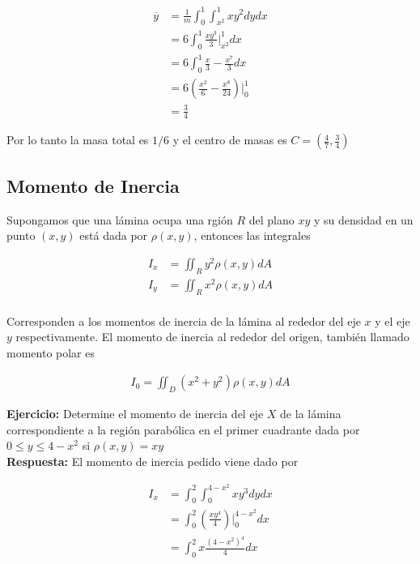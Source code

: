 \documentclass{article}
\theoremstyle{definition}
\begin{document}
\begin{align*}
    \overline{y} &= \frac{1}{m} \int_{0}^1\int_{x^2}^1 xy^2 dydx \\
        &= 6 \int_{0}^1 \frac{xy^3}{3}\bigg|_{x^2}^1 dx \\
        &= 6 \int_{0}^1 \frac{x}{3}-\frac{x^7}{3} dx \\
        &= 6 \left( \frac{x^2}{6}-\frac{x^8}{24} \right)\bigg|_0^1\\
        &=\frac{3}{4}
\end{align*}

Por lo tanto la masa total es $1/6$ y el centro de masas es $C=\displaystyle \left( \frac{4}{7},\frac{3}{4}\right)$




\newpage


\subsection{Momento de Inercia}

Supongamos que una l\'amina ocupa una rgi\'on $R$ del plano $xy$ y su densidad en un punto $(x,y)$ est\'a dada por $\rho(x,y)$, entonces las integrales


\begin{align*}
    I_x &= \iint_R y^2\rho(x,y) dA \\
    I_y &= \iint_R x^2\rho(x,y) dA \\
\end{align*}

Corresponden a los momentos de inercia de la l\'amina al rededor del eje $x$ y el eje $y$ respectivamente. El momento de inercia al rededor del origen, tambi\'en llamado momento polar es

\begin{align*}
I_0 =\iint_D (x^2+y^2)\rho(x,y)dA
\end{align*}

\textbf{Ejercicio:} Determine el momento de inercia del eje $X$ de la l\'amina correspondiente a la regi\'on parab\'olica en el primer cuadrante dada por  $0 \leq y \leq 4-x^2$ si $\rho(x,y) = xy$ \\

\textbf{Respuesta: } El momento de inercia pedido viene dado por

\begin{align*}
    I_x &= \int_{0}^2 \int_0^{4-x^2} xy^3 dy dx \\
    &= \int_{0}^2 \left(\frac{xy^4}{4}\right)\bigg|_0^{4-x^2} dx \\
    &= \int_{0}^2 x\frac{(4-x^2)^4}{4} dx \\
\end{align*}
\end{document}
